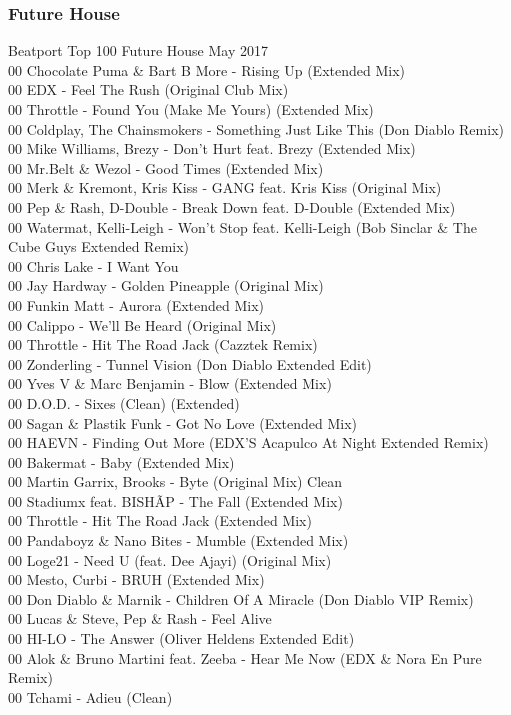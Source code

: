 \begin{multicols}{2}
 \subsubsection*{Future House}
 \large Beatport Top 100 Future House May 2017 \normalsize\\
 00 Chocolate Puma \& Bart B More - Rising Up (Extended Mix)\\ 00 EDX - Feel The Rush (Original Club Mix)\\ 00 Throttle - Found You (Make Me Yours) (Extended Mix)\\ 00 Coldplay, The Chainsmokers  - Something Just Like This (Don Diablo Remix)\\ 00 Mike Williams, Brezy - Don't Hurt feat. Brezy (Extended Mix)\\ 00 Mr.Belt \& Wezol - Good Times (Extended Mix)\\ 00 Merk \& Kremont, Kris Kiss - GANG feat. Kris Kiss (Original Mix)\\ 00 Pep \& Rash, D-Double - Break Down feat. D-Double (Extended Mix)\\ 00 Watermat, Kelli-Leigh - Won't Stop feat. Kelli-Leigh (Bob Sinclar \& The Cube Guys Extended Remix)\\ 00 Chris Lake - I Want You\\ 00 Jay Hardway - Golden Pineapple (Original Mix)\\ 00 Funkin Matt - Aurora (Extended Mix) \\ 00 Calippo -  We'll Be Heard (Original Mix)\\ 00 Throttle  -  Hit The Road Jack (Cazztek Remix)\\ 00 Zonderling - Tunnel Vision (Don Diablo Extended Edit)\\ 00 Yves V \& Marc Benjamin - Blow (Extended Mix)\\ 00 D.O.D. - Sixes (Clean) (Extended)\\ 00 Sagan \& Plastik Funk - Got No Love (Extended Mix)\\ 00 HAEVN - Finding Out More (EDX'S Acapulco At Night Extended Remix)\\ 00 Bakermat - Baby (Extended Mix)\\ 00 Martin Garrix, Brooks - Byte (Original Mix) Clean\\ 00 Stadiumx feat. BISHÃP -  The Fall (Extended Mix)\\ 00 Throttle - Hit The Road Jack (Extended Mix)  \\ 00 Pandaboyz \& Nano Bites - Mumble (Extended Mix)\\ 00 Loge21 - Need U (feat. Dee Ajayi) (Original Mix)\\ 00 Mesto, Curbi - BRUH (Extended Mix)\\ 00 Don Diablo \& Marnik - Children Of A Miracle (Don Diablo VIP Remix)\\ 00 Lucas \& Steve, Pep \& Rash - Feel Alive\\ 00 HI-LO - The Answer (Oliver Heldens Extended Edit)\\ 00 Alok \& Bruno Martini feat. Zeeba - Hear Me Now (EDX \& Nora En Pure Remix)\\ 00 Tchami - Adieu (Clean) 
\end{multicols}
